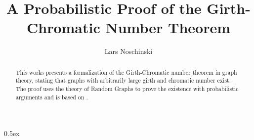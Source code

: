 \documentclass[11pt,a4paper]{article}
\begin{document}
\title{A Probabilistic Proof of the Girth-Chromatic Number Theorem}
\author{Lars Noschinski}
\maketitle

\begin{abstract}
    This works presents a formalization of the Girth-Chromatic number theorem
    in graph theory, stating that graphs with arbitrarily large girth and
    chromatic number exist. The proof uses the theory of Random Graphs to
    prove the existence with probabilistic arguments and is based on
    \cite{diestel2010graph}.
\end{abstract}

\tableofcontents

\parindent 0pt\parskip 0.5ex

%






\end{document}
